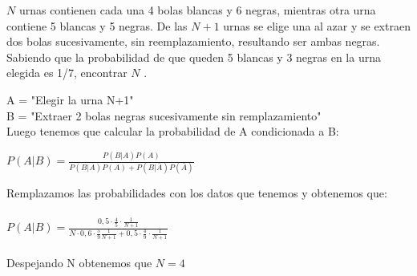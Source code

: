\problem
$ N $ urnas contienen cada una 4 bolas blancas y 6 negras, mientras otra
urna contiene 5 blancas y 5 negras. De las $ N + 1 $ urnas se elige una al
azar y se extraen dos bolas sucesivamente, sin reemplazamiento,
resultando ser ambas negras. Sabiendo que la probabilidad de que
queden 5 blancas y 3 negras en la urna elegida es 1/7, encontrar $ N $ .
	
	\begin{flushleft}
		A = "Elegir la urna N+1" \\
		B = "Extraer 2 bolas negras sucesivamente sin remplazamiento" \\
		Luego tenemos que calcular la probabilidad de A condicionada a B:\\
	\end{flushleft}
	
\begin{flushleft}
	
		$P(A|B) = \frac{P(B|A)P(A)}{P(B|A)P(A)+P(B|\bar{A})P(\bar{A})} $\\
\end{flushleft}
Remplazamos las probabilidades con los datos que tenemos y obtenemos que: \\ \\
$P(A|B) = \frac{0,5 \cdot \frac{4}{5} \cdot \frac{1}{N+1}}{N\cdot0,6\cdot\frac{5}{9}\frac{1}{N+1} + 0,5\cdot\frac{4}{9}\cdot\frac{1}{N+1}} $\\\\
Despejando N obtenemos que $N=4$
